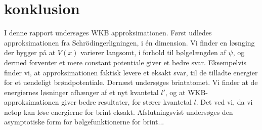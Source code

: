 \section{konklusion}
I denne rapport undersøges WKB approksimationen. Først udledes approksimationen fra Schrödingerligningen, i én dimension. Vi finder en løsnging der bygger på at $V(x)$ varierer langsomt, i forhold til bølgelængden af $\psi$, og dermed forventer et mere constant potentiale giver et bedre svar. Eksempelvis finder vi, at approksimationen faktisk levere et eksakt svar, til de tilladte energier for et uendeligt brøndpotentiale. Dernæst undersøges brintatomet. Vi finder at de energiernes løsninger afhænger af et nyt kvantetal $l'$, og at WKB-approksimationen giver bedre resultater, for stører kvantetal $l$. Det ved vi, da vi netop kan løse energierne for brint eksakt. Afslutningsvist undersøges den asymptotiske form for bølgefunktionerne for brint... %
